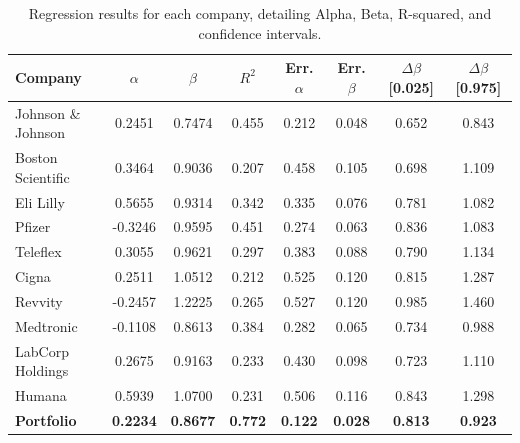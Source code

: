 \begin{table}[htbp]
    \centering
    \footnotesize
    \renewcommand{\arraystretch}{1.2} %
    \begin{tabular}{|l|c|c|c|c|c|c|c|}
        \hline
        \rowcolor{unired!30} \textbf{Company} & \textbf{$\alpha$} & \textbf{$\beta$} & \textbf{$R^2$} & \textbf{Err. $\alpha$} & \textbf{Err. $\beta$} & \textbf{$\Delta \beta$ [0.025]} & \textbf{$\Delta \beta$ [0.975]} \\ \hline
        Johnson \& Johnson & 0.2451 & 0.7474 & 0.455 & 0.212 & 0.048 & 0.652 & 0.843 \\ \hline
        \rowcolor{gray!10} Boston Scientific & 0.3464 & 0.9036 & 0.207 & 0.458 & 0.105 & 0.698 & 1.109 \\ \hline
        Eli Lilly & 0.5655 & 0.9314 & 0.342 & 0.335 & 0.076 & 0.781 & 1.082 \\ \hline
        \rowcolor{gray!10} Pfizer & -0.3246 & 0.9595 & 0.451 & 0.274 & 0.063 & 0.836 & 1.083 \\ \hline
        Teleflex & 0.3055 & 0.9621 & 0.297 & 0.383 & 0.088 & 0.790 & 1.134 \\ \hline
        \rowcolor{gray!10} Cigna & 0.2511 & 1.0512 & 0.212 & 0.525 & 0.120 & 0.815 & 1.287 \\ \hline
        Revvity & -0.2457 & 1.2225 & 0.265 & 0.527 & 0.120 & 0.985 & 1.460 \\ \hline
        \rowcolor{gray!10} Medtronic & -0.1108 & 0.8613 & 0.384 & 0.282 & 0.065 & 0.734 & 0.988 \\ \hline
        LabCorp Holdings & 0.2675 & 0.9163 & 0.233 & 0.430 & 0.098 & 0.723 & 1.110 \\ \hline
        \rowcolor{gray!10} Humana & 0.5939 & 1.0700 & 0.231 & 0.506 & 0.116 & 0.843 & 1.298 \\ \Xhline{2\arrayrulewidth}

        \textbf{Portfolio} & \textbf{0.2234} & \textbf{0.8677} & \textbf{0.772} & \textbf{0.122} & \textbf{0.028} & \textbf{0.813} & \textbf{0.923} \\ \hline
    \end{tabular}
    \caption{Regression results for each company, detailing Alpha, Beta, R-squared, and confidence intervals.}
    \label{tab:regression_results}
\end{table}

